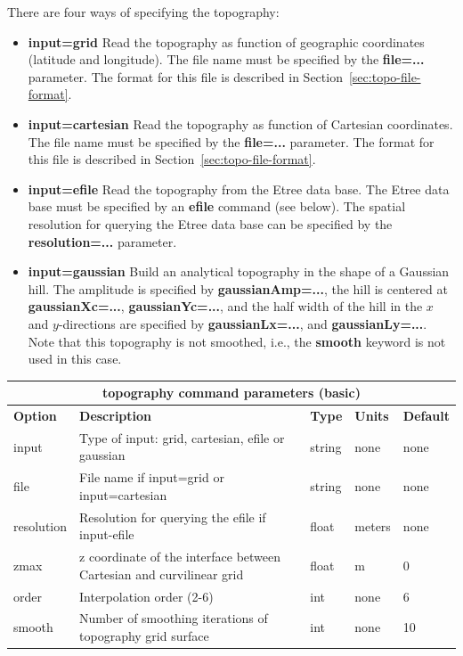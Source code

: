 \documentclass[11pt]{report}
\begin{document}
There are four ways of specifying the topography:
\begin{itemize}
\item {\bf input=grid} Read the topography as function of geographic coordinates (latitude and
  longitude). The file name must be specified by the {\bf file=...} parameter. The format for this
  file is described in Section~\ref{sec:topo-file-format}.
\item {\bf input=cartesian} Read the topography as function of Cartesian coordinates. The file name
   must be specified by the {\bf file=...} parameter. The format for this file is described in
   Section~\ref{sec:topo-file-format}.
\item {\bf input=efile} Read the topography from the Etree data base. The Etree data base must be
  specified by an {\bf efile} command (see below). The spatial resolution for querying the Etree
  data base can be specified by the {\bf resolution=...} parameter.
\item {\bf input=gaussian} Build an analytical topography in the shape of a Gaussian hill. The
  amplitude is specified by {\bf gaussianAmp=...}, the hill is centered at {\bf gaussianXc=...},
  {\bf gaussianYc=...}, and the half width of the hill in the $x$ and $y$-directions are specified by 
   {\bf gaussianLx=...}, and {\bf gaussianLy=...}. Note that this topography is not smoothed, i.e.,
   the {\bf smooth} keyword is not used in this case.
\end{itemize}
%
\begin{center}
\begin{tabular}{|l|p{8cm}|l|l|l|} \hline
\multicolumn{5}{|c|}{\bf topography command parameters (basic)}\\ \hline
\bf{Option} & \bf{Description} & \bf{Type} & \bf{Units} & \bf{Default}\\ \hline \hline
%
input & Type of input: grid, cartesian, efile or gaussian & string & none & none\\ \hline
%
file & File name if input=grid or input=cartesian & string & none & none\\ \hline
%
resolution & Resolution for querying the efile if input-efile & float & meters & none \\ \hline
%
zmax & z coordinate of the interface between  Cartesian and curvilinear grid& float &  m & 0\\ \hline
%
order & Interpolation order (2-6) & int & none & 6\\ \hline
%
smooth & Number of smoothing iterations of topography grid surface & int & none & 10 \\ \hline
\end{tabular}
\end{center}
\end{document}
